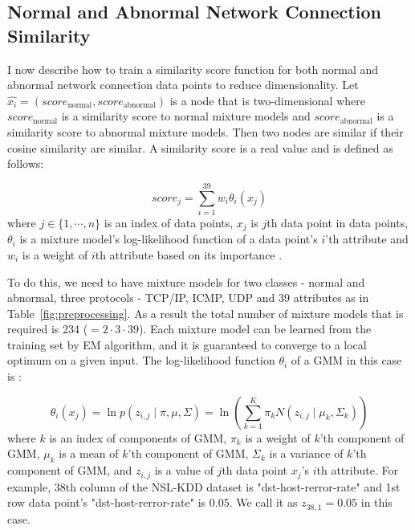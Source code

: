 \subsection{Normal and Abnormal Network Connection Similarity}
\label{subsec:normalabnormalsimilarity}
I now describe how to train a similarity score function for both normal and abnormal network connection data points to reduce dimensionality. 
Let $\hat{x_i} = (score_{\text{normal}}, score_{\text{abnormal}})$ is a node that is two-dimensional 
where $score_{\text{normal}}$ is a similarity score to normal mixture models 
and $score_{\text{abnormal}}$ is a similarity score to abnormal mixture models. 
Then two nodes are similar if their cosine similarity are similar. 
A similarity score is a real value and is defined as follows:

\begin{equation}
    score_j = \sum_{i=1}^{39} w_i \theta_i (x_j) 
\end{equation}
where $j \in \{1,\cdots,n\}$ is an index of data points, $x_j$ is $j$th data point in data points, $\theta_i$ is a mixture model's log-likelihood function of a data point's $i$'th attribute and $w_i$ is a weight of $i$th attribute based on its importance \cite{kayacik05}. 

To do this, we need to have mixture models for two classes - normal and abnormal, three protocols - TCP/IP, ICMP, UDP and 39 attributes as in Table~\ref{fig:preprocessing}. 
As a result the total number of mixture models that is required is 234 ($= 2 \cdot 3 \cdot 39$).
Each mixture model can be learned from the training set by EM algorithm, and it is guaranteed to converge to a local optimum on a given input. 
The log-likelihood function $\theta_i$ of a GMM in this case is :

\begin{equation}
    \theta_i(x_j) = \ln p(z_{i,j} \mid \pi, \mu, \Sigma) = \ln (\sum_{k=1}^K \pi_k N(z_{i,j} \mid \mu_k, \Sigma_k))
\end{equation}
where $k$ is an index of components of GMM, 
$\pi_k$ is a weight of $k$'th component of GMM, 
$\mu_k$ is a mean of $k$'th component of GMM, 
$\Sigma_k$ is a variance of $k$'th component of GMM, 
and $z_{i,j}$ is a value of $j$th data point $x_j$'s $i$th attribute. 
For example, 38th column of the NSL-KDD dataset is "dst-host-rerror-rate" and 1st row data point's "dst-host-rerror-rate" is $0.05$. 
We call it as $z_{38,1} = 0.05$ in this case. 

